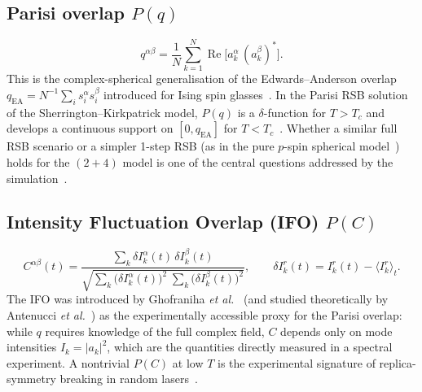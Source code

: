 \documentclass[11pt,a4paper]{article}
\newcommand{\avg}[1]{\langle #1 \rangle}
\newcommand{\re}{\operatorname{Re}}
\begin{document}
\subsection{Parisi overlap $P(q)$}\label{sec:parisi}
\begin{equation}\label{eq:parisi_q}
  q^{\alpha\beta}
  = \frac{1}{N}\sum_{k=1}^{N}
    \re\bigl[a_k^{\alpha}\,(a_k^{\beta})^*\bigr].
\end{equation}
This is the complex-spherical generalisation of the Edwards--Anderson
overlap $q_{\mathrm{EA}} = N^{-1}\sum_i s_i^\alpha s_i^\beta$
introduced for Ising spin
glasses~\cite{EdwardsAnderson1975,MPV1987}.  In the
Parisi RSB solution of the Sherrington--Kirkpatrick model, $P(q)$
is a $\delta$-function for $T > T_c$ and develops a continuous
support on $[0, q_{\mathrm{EA}}]$ for
$T < T_c$~\cite{Parisi1979,Parisi1983,MPV1987}.
Whether a similar full RSB scenario or a simpler 1-step RSB
(as in the pure $p$-spin spherical
model~\cite{CrisantiSommers1992}) holds for the $(2{+}4)$ model
is one of the central questions addressed by the
simulation~\cite{Antenucci2015a}.

\subsection{Intensity Fluctuation Overlap (IFO) $P(C)$}
\begin{equation}\label{eq:ifo}
  C^{\alpha\beta}(t)
  = \frac{\displaystyle\sum_k \delta I_k^{\alpha}(t)\,\delta I_k^{\beta}(t)}
         {\sqrt{\displaystyle\sum_k \bigl(\delta I_k^{\alpha}(t)\bigr)^2
                \;\sum_k \bigl(\delta I_k^{\beta}(t)\bigr)^2}},
  \qquad
  \delta I_k^{r}(t) = I_k^{r}(t) - \avg{I_k^{r}}_t.
\end{equation}
The IFO was introduced by Ghofraniha \emph{et
al.}~\cite{Ghofraniha2015} (and studied theoretically
by Antenucci \emph{et al.}~\cite{Antenucci2015b}) as the
experimentally accessible proxy for the Parisi overlap: while $q$
requires knowledge of the full complex field, $C$ depends only on mode
intensities $I_k = |a_k|^2$, which are the quantities directly
measured in a spectral experiment.  A nontrivial $P(C)$ at low $T$
is the experimental signature of replica-symmetry breaking in
random lasers~\cite{Ghofraniha2015,Antenucci2015b}.

\end{document}
